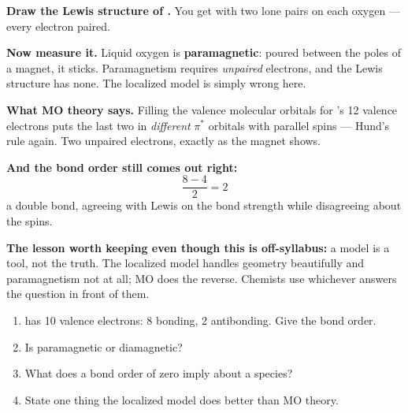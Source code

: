 \documentclass{apchem-worksheet}
\begin{document}
\begin{workedexample}
\textbf{Draw the Lewis structure of .} You get  with two
lone pairs on each oxygen --- every electron paired.

\textbf{Now measure it.} Liquid oxygen is \textbf{paramagnetic}: poured
between the poles of a magnet, it sticks. Paramagnetism requires
\emph{unpaired} electrons, and the Lewis structure has none. The
localized model is simply wrong here.

\textbf{What MO theory says.} Filling the valence molecular orbitals for
's 12 valence electrons puts the last two in \emph{different}
$\pi^{*}$ orbitals with parallel spins --- Hund's rule again. Two
unpaired electrons, exactly as the magnet shows.

\textbf{And the bond order still comes out right:}
\[ \frac{8 - 4}{2} = 2 \]
a double bond, agreeing with Lewis on the bond strength while
disagreeing about the spins.

\textbf{The lesson worth keeping even though this is off-syllabus:} a
model is a tool, not the truth. The localized model handles geometry
beautifully and paramagnetism not at all; MO does the reverse. Chemists
use whichever answers the question in front of them.
\end{workedexample}

\begin{yourturn}
\begin{enumerate}[leftmargin=*,itemsep=0.5em]
  \item {} has 10 valence electrons: 8 bonding, 2 antibonding. Give
        the bond order. \workspace[1.4cm]
  \item Is  paramagnetic or diamagnetic? \workspace[1.4cm]
  \item What does a bond order of zero imply about a species?
        \workspace[1.4cm]
  \item State one thing the localized model does better than MO theory.
        \workspace[1.6cm]
\end{enumerate}
\end{yourturn}
\end{document}
